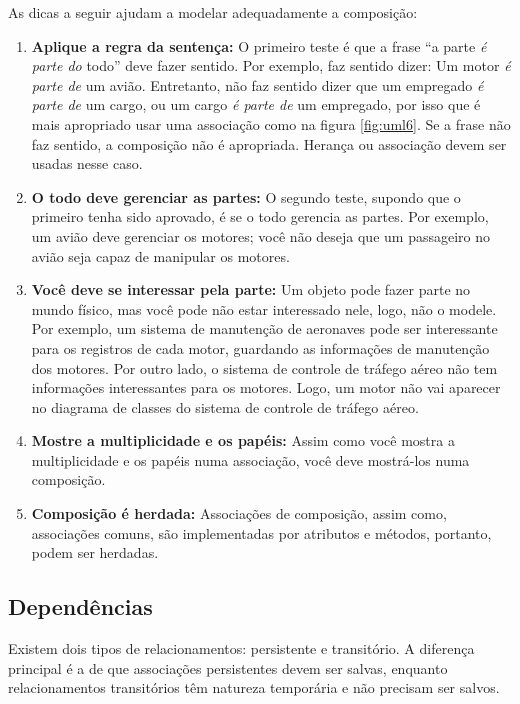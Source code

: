 As dicas a seguir ajudam a modelar adequadamente a composição:
\begin{enumerate}
\item \textbf{Aplique a regra da sentença:} O primeiro teste é que a frase ``a parte \emph{é parte do} todo'' deve fazer sentido. Por exemplo, faz sentido dizer: Um motor \emph{é parte de} um avião. Entretanto, não faz sentido dizer que um empregado \emph{é parte de} um cargo, ou um cargo \emph{é parte de} um empregado, por isso que é mais apropriado usar uma associação como na figura \ref{fig:uml6}. Se a frase não faz sentido, a composição não é apropriada. Herança ou associação devem ser usadas nesse caso.

\item \textbf{O todo deve gerenciar as partes:} O segundo teste, supondo que o primeiro tenha sido aprovado, é se o todo gerencia as partes. Por exemplo, um avião deve gerenciar os motores; você não deseja que um passageiro no avião seja capaz de manipular os motores.

\item \textbf{Você deve se interessar pela parte:} Um objeto pode fazer parte no mundo físico, mas você pode não estar interessado nele, logo, não o modele. Por exemplo, um sistema de manutenção de aeronaves pode ser interessante para os registros de cada motor, guardando as informações de manutenção dos motores. Por outro lado, o sistema de controle de tráfego aéreo não tem informações interessantes para os motores. Logo, um motor não vai aparecer no diagrama de classes do sistema de controle de tráfego aéreo.

\item \textbf{Mostre a multiplicidade e os papéis:} Assim como você mostra a multiplicidade e os papéis numa associação, você deve mostrá-los numa composição.

\item \textbf{Composição é herdada:} Associações de composição, assim como, associações comuns, são implementadas por atributos e métodos, portanto, podem ser herdadas.
\end{enumerate}

\subsection{Dependências}

Existem dois tipos de relacionamentos: persistente e transitório. A diferença principal é a de que associações persistentes devem ser salvas, enquanto relacionamentos transitórios têm natureza temporária e não precisam ser salvos.

